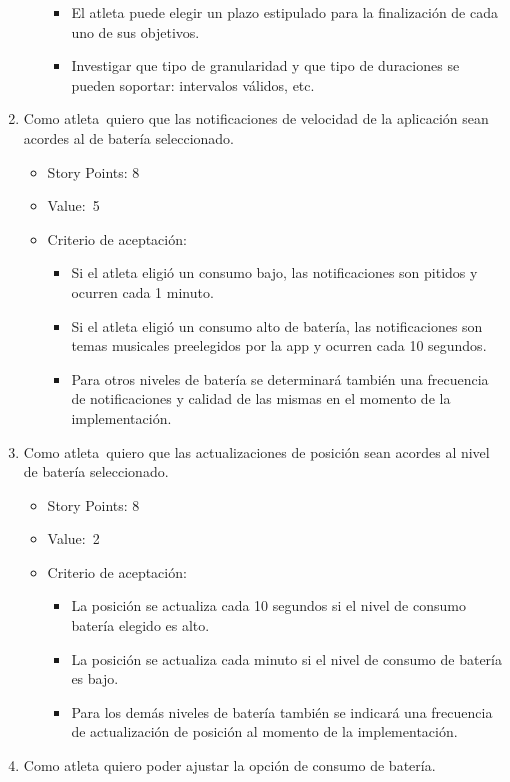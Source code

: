 \begin{enumerate}
\begin{itemize}
    \begin{itemize}
    \item
      El atleta puede elegir un plazo estipulado para la finalización de
      cada uno de sus objetivos.
    \item
      Investigar que tipo de granularidad y que tipo de duraciones se
      pueden soportar: intervalos válidos, etc.
    \end{itemize}
  \end{itemize}
\item
  Como atleta~quiero que las notificaciones de velocidad de la
  aplicación sean acordes al de batería seleccionado.

  \begin{itemize}
  \item
    Story Points: 8
  \item
    Value:~5
  \item
    Criterio de aceptación:

    \begin{itemize}
    \item
      Si el atleta eligió un consumo bajo, las notificaciones son
      pitidos y ocurren cada 1 minuto.
    \item
      Si el atleta eligió un consumo alto de batería, las notificaciones
      son temas musicales preelegidos por la app y ocurren cada 10
      segundos.
    \item
      Para otros niveles de batería se determinará también una
      frecuencia de notificaciones y calidad de las mismas en el momento
      de la implementación.
    \end{itemize}
  \end{itemize}
\item
  Como atleta~quiero que las actualizaciones de posición sean acordes al
  nivel de batería seleccionado.

  \begin{itemize}
  \item
    Story Points: 8
  \item
    Value:~2
  \item
    Criterio de aceptación:

    \begin{itemize}
    \itemsep1pt\parskip0pt
    \item
      La posición se actualiza cada 10 segundos si el nivel de consumo
      batería elegido es alto.
    \item
      La posición se actualiza cada minuto si el nivel de consumo de
      batería es bajo.
    \item
      Para los demás niveles de batería también se indicará una
      frecuencia de actualización de posición al momento de la
      implementación.
    \end{itemize}
  \end{itemize}
\item
  Como atleta quiero poder ajustar la opción de consumo de batería.


\end{enumerate}
